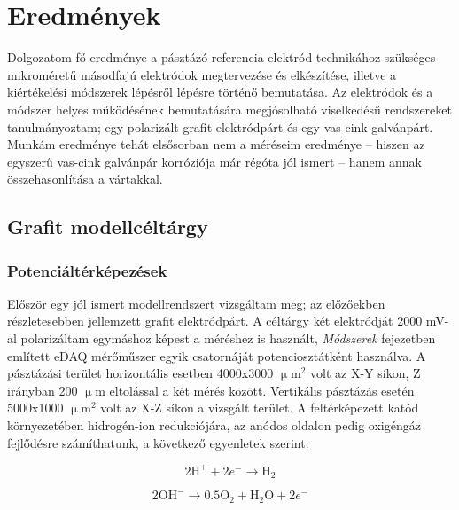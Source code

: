 \chapter{Eredmények}
\pagestyle{headings}

Dolgozatom fő eredménye a pásztázó referencia elektród technikához szükséges mikroméretű másodfajú elektródok megtervezése és elkészítése, illetve a kiértékelési módszerek lépésről lépésre történő bemutatása. Az elektródok és a módszer helyes működésének bemutatására megjósolható viselkedésű rendszereket tanulmányoztam; egy polarizált grafit elektródpárt és egy vas-cink galvánpárt. Munkám eredménye tehát elsősorban nem a méréseim eredménye -- hiszen az egyszerű vas-cink galvánpár korróziója már régóta jól ismert -- hanem annak összehasonlítása a vártakkal.

\section{Grafit modellcéltárgy}
\subsection{Potenciáltérképezések}

Először egy jól ismert modellrendszert vizsgáltam meg; az előzőekben részletesebben jellemzett grafit elektródpárt. A céltárgy két elektródját 2000 mV-al polarizáltam egymáshoz képest a méréshez is használt, \emph{Módszerek} fejezetben említett eDAQ mérőműszer egyik csatornáját potenciosztátként használva. A pásztázási terület horizontális esetben 4000x3000 $\upmu$m$^2$ volt az X-Y síkon, Z irányban 200 $\upmu$m eltolással a két mérés között. Vertikális pásztázás esetén 5000x1000 $\upmu$m$^2$ volt az X-Z síkon a vizsgált terület. A feltérképezett katód környezetében hidrogén-ion redukciójára, az anódos oldalon pedig oxigéngáz fejlődésre számíthatunk, a következő egyenletek szerint:

\begin{equation}
2\textrm{H}^+ + 2e^- \longrightarrow \textrm{H}_2
\label{grafit_katod}
\end{equation}

\begin{equation}
2\textrm{OH}^- \longrightarrow 0.5 \textrm{O}_2 + \textrm{H}_2\textrm{O} + 2e^-
\label{grafit_anod}
\end{equation}

